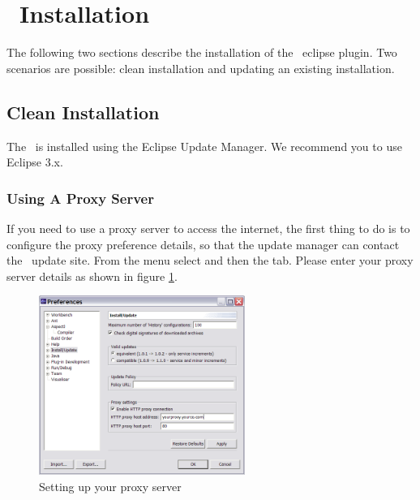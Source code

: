 \section{\cjdt ~Installation}
The following two sections describe the installation of the \caesarj ~eclipse plugin. Two scenarios are possible: clean installation and updating an existing installation.
\subsection{Clean Installation} 

The \cjdt ~is installed using the Eclipse Update Manager. We recommend you to use Eclipse 3.x.
\subsubsection{Using A Proxy Server} 
If you need to use a proxy server to access the internet, the first thing
to do is to configure the proxy preference details, so that the update manager can contact the
\cjdt ~update site. From the  menu select  and then the
 tab. Please enter your proxy server details as shown in figure \ref{fig:proxy}.
\begin{figure}[htbp]
	\centering
		\includegraphics[width=0.60\textwidth]{./images/proxy.png}
	\caption{Setting up your proxy server}
	\label{fig:proxy}
\end{figure}

